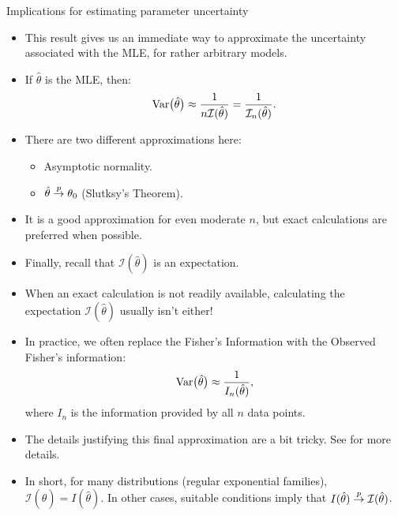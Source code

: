 \begin{frame}[allowframebreaks]{Implications for estimating parameter uncertainty}
  \begin{itemize}
    \item This result gives us an immediate way to approximate the uncertainty associated with the MLE, for rather arbitrary models.
    \item If $\hat{\theta}$ is the MLE, then:
    $$
    \mathrm{Var}\big(\hat{\theta}\big) \approx \frac{1}{n\mathcal{I}(\hat{\theta})} = \frac{1}{\mathcal{I}_n(\hat{\theta})}.
    $$
    \item \alert{There are two different approximations here}:
    \begin{itemize}
      \item Asymptotic normality.
      \item $\hat{\theta} \overset{p}{\rightarrow} \theta_0$ (Slutksy's Theorem).
    \end{itemize}
    \item It is a good approximation for even moderate $n$, but exact calculations are preferred when possible.
    \item Finally, recall that $\mathcal{I}(\hat{\theta})$ is an \alert{expectation}.
    \item When an exact calculation is not readily available, calculating the expectation $\mathcal{I}(\hat{\theta})$ usually isn't either!
    \item In practice, we often replace the Fisher's Information with the Observed Fisher's information:
    $$
    \mathrm{Var}\big(\hat{\theta}\big) \approx \frac{1}{I_n(\hat{\theta})},
    $$
    where $I_n$ is the information provided by all $n$ data points.
    \item The details justifying this final approximation are a bit tricky. See \citet[][Chapter~9]{keener10} for more details.
    \item In short, for many distributions (regular exponential families), $\mathcal{I}(\hat{\theta}) = I(\hat{\theta})$. In other cases, suitable conditions imply that $I(\hat{\theta}) \overset{p}{\rightarrow} \mathcal{I}(\hat{\theta})$.
  \end{itemize}
\end{frame}

